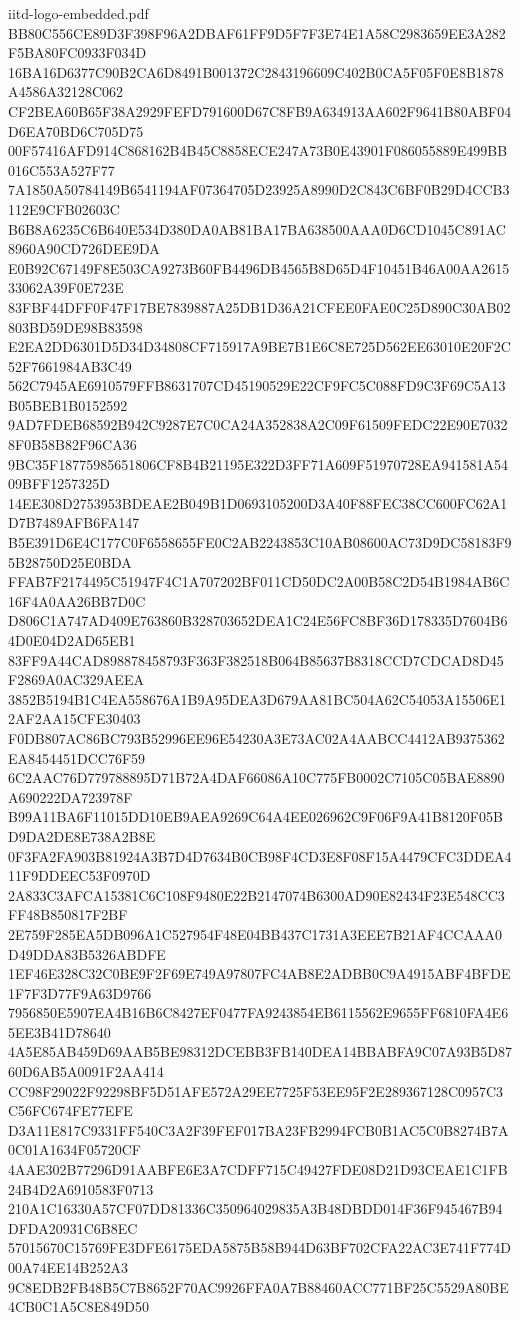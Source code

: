 \begin{filecontents*}[overwrite]{iitd-logo-embedded.pdf}
BB80C556CE89D3F398F96A2DBAF61FF9D5F7F3E74E1A58C2983659EE3A282F5BA80FC0933F034D
16BA16D6377C90B2CA6D8491B001372C2843196609C402B0CA5F05F0E8B1878A4586A32128C062
CF2BEA60B65F38A2929FEFD791600D67C8FB9A634913AA602F9641B80ABF04D6EA70BD6C705D75
00F57416AFD914C868162B4B45C8858ECE247A73B0E43901F086055889E499BB016C553A527F77
7A1850A50784149B6541194AF07364705D23925A8990D2C843C6BF0B29D4CCB3112E9CFB02603C
B6B8A6235C6B640E534D380DA0AB81BA17BA638500AAA0D6CD1045C891AC8960A90CD726DEE9DA
E0B92C67149F8E503CA9273B60FB4496DB4565B8D65D4F10451B46A00AA261533062A39F0E723E
83FBF44DFF0F47F17BE7839887A25DB1D36A21CFEE0FAE0C25D890C30AB02803BD59DE98B83598
E2EA2DD6301D5D34D34808CF715917A9BE7B1E6C8E725D562EE63010E20F2C52F7661984AB3C49
562C7945AE6910579FFB8631707CD45190529E22CF9FC5C088FD9C3F69C5A13B05BEB1B0152592
9AD7FDEB68592B942C9287E7C0CA24A352838A2C09F61509FEDC22E90E70328F0B58B82F96CA36
9BC35F18775985651806CF8B4B21195E322D3FF71A609F51970728EA941581A5409BFF1257325D
14EE308D2753953BDEAE2B049B1D0693105200D3A40F88FEC38CC600FC62A1D7B7489AFB6FA147
B5E391D6E4C177C0F6558655FE0C2AB2243853C10AB08600AC73D9DC58183F95B28750D25E0BDA
FFAB7F2174495C51947F4C1A707202BF011CD50DC2A00B58C2D54B1984AB6C16F4A0AA26BB7D0C
D806C1A747AD409E763860B328703652DEA1C24E56FC8BF36D178335D7604B64D0E04D2AD65EB1
83FF9A44CAD898878458793F363F382518B064B85637B8318CCD7CDCAD8D45F2869A0AC329AEEA
3852B5194B1C4EA558676A1B9A95DEA3D679AA81BC504A62C54053A15506E12AF2AA15CFE30403
F0DB807AC86BC793B52996EE96E54230A3E73AC02A4AABCC4412AB9375362EA8454451DCC76F59
6C2AAC76D779788895D71B72A4DAF66086A10C775FB0002C7105C05BAE8890A690222DA723978F
B99A11BA6F11015DD10EB9AEA9269C64A4EE026962C9F06F9A41B8120F05BD9DA2DE8E738A2B8E
0F3FA2FA903B81924A3B7D4D7634B0CB98F4CD3E8F08F15A4479CFC3DDEA411F9DDEEC53F0970D
2A833C3AFCA15381C6C108F9480E22B2147074B6300AD90E82434F23E548CC3FF48B850817F2BF
2E759F285EA5DB096A1C527954F48E04BB437C1731A3EEE7B21AF4CCAAA0D49DDA83B5326ABDFE
1EF46E328C32C0BE9F2F69E749A97807FC4AB8E2ADBB0C9A4915ABF4BFDE1F7F3D77F9A63D9766
7956850E5907EA4B16B6C8427EF0477FA9243854EB6115562E9655FF6810FA4E65EE3B41D78640
4A5E85AB459D69AAB5BE98312DCEBB3FB140DEA14BBABFA9C07A93B5D8760D6AB5A0091F2AA414
CC98F29022F92298BF5D51AFE572A29EE7725F53EE95F2E289367128C0957C3C56FC674FE77EFE
D3A11E817C9331FF540C3A2F39FEF017BA23FB2994FCB0B1AC5C0B8274B7A0C01A1634F05720CF
4AAE302B77296D91AABFE6E3A7CDFF715C49427FDE08D21D93CEAE1C1FB24B4D2A6910583F0713
210A1C16330A57CF07DD81336C350964029835A3B48DBDD014F36F945467B94DFDA20931C6B8EC
57015670C15769FE3DFE6175EDA5875B58B944D63BF702CFA22AC3E741F774D00A74EE14B252A3
9C8EDB2FB48B5C7B8652F70AC9926FFA0A7B88460ACC771BF25C5529A80BE4CB0C1A5C8E849D50

\end{filecontents*}
